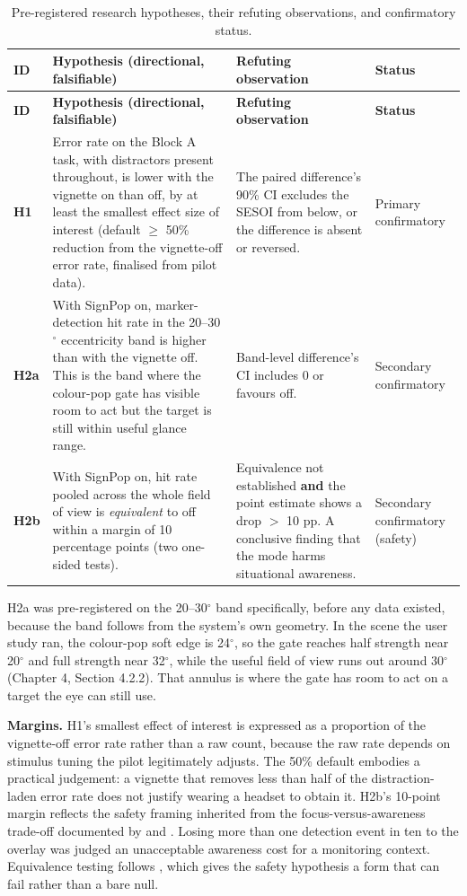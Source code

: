 \begin{longtable}{p{}|p{}|p{}|p{}}
\caption{Pre-registered research hypotheses, their refuting observations, and confirmatory status.}
\label{tab:hyp} \\
\hline
\textbf{ID} & \textbf{Hypothesis (directional, falsifiable)} & \textbf{Refuting observation} & \textbf{Status} \\
\hline
\endfirsthead
\hline
\textbf{ID} & \textbf{Hypothesis (directional, falsifiable)} & \textbf{Refuting observation} & \textbf{Status} \\
\hline
\endhead
\hline
\textbf{H1} & Error rate on the Block A task, with distractors present throughout, is lower with the vignette on than off, by at least the smallest effect size of interest (default $\geq$ 50\% reduction from the vignette-off error rate, finalised from pilot data). & The paired difference's 90\% CI excludes the SESOI from below, or the difference is absent or reversed. & Primary confirmatory \\
\textbf{H2a} & With SignPop on, marker-detection hit rate in the 20–30$^{\circ}$ eccentricity band is higher than with the vignette off. This is the band where the colour-pop gate has visible room to act but the target is still within useful glance range. & Band-level difference's CI includes 0 or favours off. & Secondary confirmatory \\
\textbf{H2b} & With SignPop on, hit rate pooled across the whole field of view is \textit{equivalent} to off within a margin of 10 percentage points (two one-sided tests). & Equivalence not established \textbf{and} the point estimate shows a drop $>$ 10 pp. A conclusive finding that the mode harms situational awareness. & Secondary confirmatory (safety) \\
\hline
\end{longtable}

H2a was pre-registered on the 20--30$^{\circ}$ band specifically, before any data existed, because
the band follows from the system's own geometry. In the scene the user study ran, the colour-pop
soft edge is 24$^{\circ}$, so the gate reaches half strength near 20$^{\circ}$ and full strength near
32$^{\circ}$, while the useful field of view runs out around 30$^{\circ}$ (Chapter 4,
Section 4.2.2). That annulus is where the gate has room to act on a target the eye can still use.

\textbf{Margins.} H1's smallest effect of interest is expressed as a proportion of the vignette-off
error rate rather than a raw count, because the raw rate depends on stimulus tuning the pilot
legitimately adjusts. The 50\% default embodies a practical judgement: a vignette that removes less
than half of the distraction-laden error rate does not justify wearing a headset to obtain it. H2b's
10-point margin reflects the safety framing inherited from the focus-versus-awareness trade-off
documented by \citet{mclaughlin2025} and \citet{murph2021}. Losing more than one detection event in
ten to the overlay was judged an unacceptable awareness cost for a monitoring context. Equivalence testing
follows \citet{lakens2017}, which gives the safety hypothesis a form that can fail rather than a bare
null.

